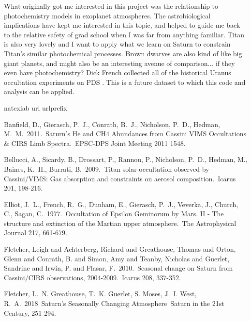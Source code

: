\documentclass[12pt]{article}
\begin{document}
What originally got me interested in this project was the relationship to
photochemistry models in exoplanet atmospheres. The astrobiological
implications have kept me interested in this topic, and helped to guide me back
to the relative safety of grad school when I was far from anything familiar.
Titan is also very lovely and I want to apply what we learn on Saturn to
constrain Titan's similar photochemical processes. Brown dwarves are also kind
of like big giant planets, and might also be an interesting avenue of
comparison... if they even have photochemistry?  Dick French collected all of
the historical Uranus occultation experiments on PDS \citep{French23}. This is
a future dataset to which this code and analysis can be applied.

\begin{thebibliography}{28}
\expandafter\ifx\csname natexlab\endcsname\relax\def\natexlab#1{#1}\fi
\expandafter\ifx\csname url\endcsname\relax
 \def\url#1{\texttt{#1}}\fi
\expandafter\ifx\csname urlprefix\endcsname\relax\def\urlprefix{URL }\fi
\providecommand{\eprint}[2][]{\url{#2}}

 Banfield, D., Gierasch, P.~J.,
Conrath, B.~J., Nicholson, P.~D., Hedman, M.~M.\ 2011.\ Saturn's He and CH4
Abundances from Cassini VIMS Occultations \& CIRS Limb Spectra.\ EPSC-DPS
Joint Meeting 2011 1548.

 Bellucci, A., Sicardy, B., Drossart, P.,
Rannou, P., Nicholson, P.~D., Hedman, M., Baines, K.~H., Burrati, B.\ 2009.\
Titan solar occultation observed by Cassini/VIMS: Gas absorption and
constraints on aerosol composition.\ Icarus 201, 198-216.

 Elliot, J.~L., French, R.~G.,
Dunham, E., Gierasch, P.~J., Veverka, J., Church, C., Sagan, C.\ 1977.\ Occultation
of Epsilon Geminorum by Mars. II - The structure and extinction of the Martian
upper atmosphere.\ The Astrophysical Journal 217, 661-679.

 Fletcher, Leigh and Achterberg,
Richard and Greathouse, Thomas and Orton, Glenn and Conrath, B. and Simon, Amy
and Teanby, Nicholas and Guerlet, Sandrine and Irwin, P. and Flasar, F.\ 2010.\
Seasonal change on Saturn from Cassini/CIRS observations, 2004-2009.\ Icarus
208, 337-352.

 {Fletcher}, L.~N. {Greathouse},
T.~K. {Guerlet}, S. {Moses}, J.~I. {West}, R.~A.\ 2018\ Saturn's Seasonally
Changing Atmosphere\ Saturn in the 21st Century, 251-294.


\end{thebibliography}
\end{document}
